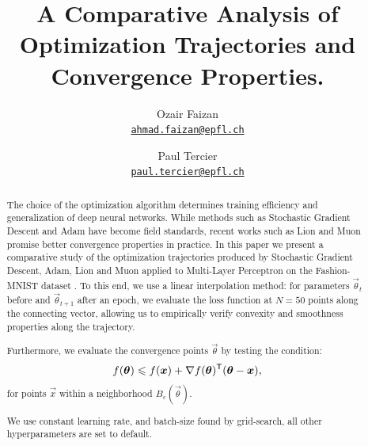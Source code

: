 \documentclass[10pt,conference,compsocconf]{IEEEtran}
\begin{document}
\title{
    A Comparative Analysis of Optimization Trajectories and Convergence Properties.
}
\author{
    Ozair Faizan \\
        \texttt{\href{mailto:ahmad.faizan@epfl.ch}{ahmad.faizan@epfl.ch}} \and
    Paul Tercier \\
        \texttt{\href{mailto:paul.tercier@epfl.ch}{paul.tercier@epfl.ch}}\\
}
\maketitle



\begin{abstract}
    The choice of the optimization algorithm determines training efficiency and generalization of
    deep neural networks. While methods such as Stochastic Gradient Descent and Adam have become
    field standards, recent works such as Lion \cite{chen2025lionsecretlysolvesconstrained}
    and Muon \cite{jordan2024muon} promise better convergence properties in practice.
    In this paper we present a comparative study of the optimization trajectories produced
    by Stochastic Gradient Descent, Adam, Lion and Muon applied to Multi-Layer
    Perceptron on the Fashion-MNIST dataset \cite{xiao2017/online}.
    To this end, we use a linear interpolation method: for parameters $\vec{\theta}_t$ before and
    $\vec{\theta}_{t+1}$ after an epoch, we evaluate the loss function at $N=50$ points along
    the connecting vector, allowing us to empirically verify convexity and smoothness properties
    along the trajectory.

    Furthermore, we evaluate the convergence points $\vec{\theta}$ by testing the condition:
    $$ f(\boldsymbol{\theta}) \leqslant f(\boldsymbol{x}) + \nabla f(\boldsymbol{\theta})^\mathsf{T} (\boldsymbol{\theta} - \boldsymbol{x}), $$
    for points $\vec{x}$ within a neighborhood $B_\varepsilon(\vec{\theta})$. 

    We use constant learning rate, and batch-size found by grid-search, all other hyperparameters
    are set to default.
\end{abstract}
\end{document}

